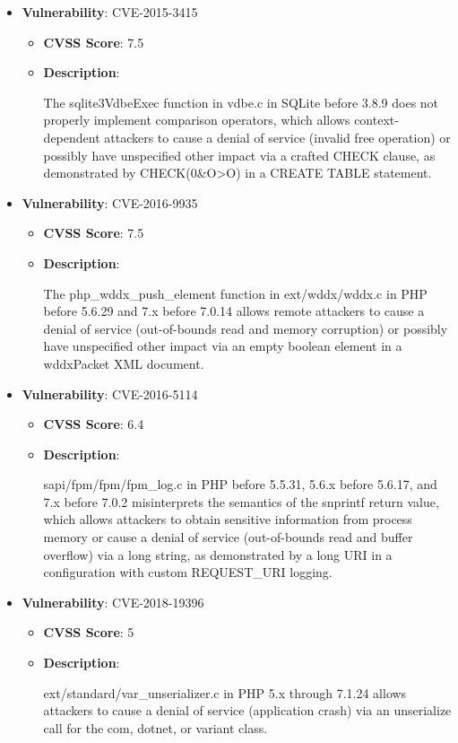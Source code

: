 \documentclass{article}
\begin{document}
\begin{itemize}
        \item \textbf{Vulnerability}: CVE-2015-3415
        \begin{itemize}
            \item \textbf{CVSS Score}:  7.5 
            \item \textbf{Description}:
            \parbox[t]{0.9\linewidth}{
                \ttfamily The sqlite3VdbeExec function in vdbe.c in SQLite before 3.8.9 does not properly implement comparison operators, which allows context-dependent attackers to cause a denial of service (invalid free operation) or possibly have unspecified other impact via a crafted CHECK clause, as demonstrated by CHECK(0\&O>O) in a CREATE TABLE statement.
            }
        \end{itemize}
    
        \item \textbf{Vulnerability}: CVE-2016-9935
        \begin{itemize}
            \item \textbf{CVSS Score}:  7.5 
            \item \textbf{Description}:
            \parbox[t]{0.9\linewidth}{
                \ttfamily The php\_wddx\_push\_element function in ext/wddx/wddx.c in PHP before 5.6.29 and 7.x before 7.0.14 allows remote attackers to cause a denial of service (out-of-bounds read and memory corruption) or possibly have unspecified other impact via an empty boolean element in a wddxPacket XML document.
            }
        \end{itemize}
    
        \item \textbf{Vulnerability}: CVE-2016-5114
        \begin{itemize}
            \item \textbf{CVSS Score}:  6.4 
            \item \textbf{Description}:
            \parbox[t]{0.9\linewidth}{
                \ttfamily sapi/fpm/fpm/fpm\_log.c in PHP before 5.5.31, 5.6.x before 5.6.17, and 7.x before 7.0.2 misinterprets the semantics of the snprintf return value, which allows attackers to obtain sensitive information from process memory or cause a denial of service (out-of-bounds read and buffer overflow) via a long string, as demonstrated by a long URI in a configuration with custom REQUEST\_URI logging.
            }
        \end{itemize}
    
        \item \textbf{Vulnerability}: CVE-2018-19396
        \begin{itemize}
            \item \textbf{CVSS Score}:  5 
            \item \textbf{Description}:
            \parbox[t]{0.9\linewidth}{
                \ttfamily ext/standard/var\_unserializer.c in PHP 5.x through 7.1.24 allows attackers to cause a denial of service (application crash) via an unserialize call for the com, dotnet, or variant class.
            }
        \end{itemize}
    

\end{itemize}
\end{document}
